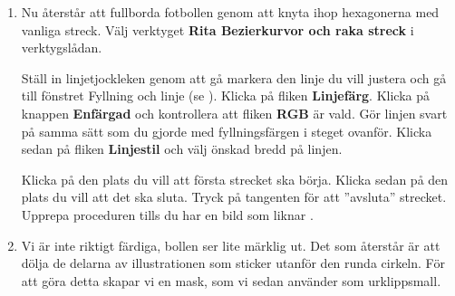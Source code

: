 \documentclass[a4paper,final]{memoir} %
\begin{document}
\begin{enumerate}
\item Nu återstår att fullborda fotbollen genom att knyta ihop hexagonerna med vanliga streck. Välj verktyget \textbf{Rita Bezierkurvor och raka streck} i verktygslådan.



Ställ in linjetjockleken genom att gå markera den linje du vill justera och gå till fönstret Fyllning och linje (se ). Klicka på fliken \textbf{Linjefärg}. Klicka på knappen \textbf{Enfärgad} och kontrollera att fliken \textbf{RGB} är vald. Gör linjen svart på samma sätt som du gjorde med fyllningsfärgen i steget ovanför. Klicka sedan på fliken \textbf{Linjestil} och välj önskad bredd på linjen. 

Klicka på den plats du vill att första strecket ska börja. Klicka sedan på den plats du vill att det ska sluta. Tryck på tangenten  för att ''avsluta'' strecket. Upprepa proceduren tills du har en bild som liknar .





\item Vi är inte riktigt färdiga, bollen ser lite märklig ut. Det som återstår är att dölja de delarna av illustrationen som sticker utanför den runda cirkeln. För att göra detta skapar vi en mask, som vi sedan använder som urklippsmall. 


\end{enumerate}
\end{document}
